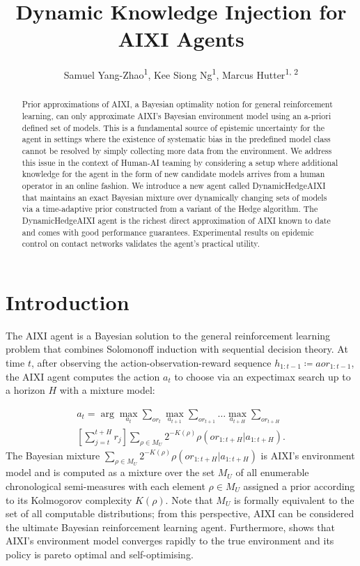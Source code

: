 \documentclass[letterpaper]{article} %
\title{Dynamic Knowledge Injection for AIXI Agents}
\author{
    Samuel Yang-Zhao\textsuperscript{\rm 1},
    Kee Siong Ng\textsuperscript{\rm 1},
    Marcus Hutter\textsuperscript{\rm 1, 2}
}
\theoremstyle{definition}
\begin{document}
\maketitle


\begin{abstract}
Prior approximations of AIXI, a Bayesian optimality notion for general reinforcement learning, can only approximate AIXI's Bayesian environment model using an a-priori defined set of models. This is a fundamental source of epistemic uncertainty for the agent in settings where the existence of systematic bias in the predefined model class cannot be resolved by simply collecting more data from the environment. We address this issue in the context of Human-AI teaming by considering a setup where additional knowledge for the agent in the form of new candidate models arrives from a human operator in an online fashion. We introduce a new agent called DynamicHedgeAIXI that maintains an exact Bayesian mixture over dynamically changing sets of models via a time-adaptive prior constructed from a variant of the Hedge algorithm. The DynamicHedgeAIXI agent is the richest direct approximation of AIXI known to date and comes with good performance guarantees. Experimental results on epidemic control on contact networks validates the agent's practical utility.
\end{abstract}



\section{Introduction}
The AIXI agent \cite{Hutter:04uaibook} is a Bayesian solution to the general reinforcement learning problem that combines Solomonoff induction \cite{solomonoff97} with sequential decision theory. At time $t$, after observing the action-observation-reward sequence $h_{1:t-1} \coloneqq aor_{1:t-1}$, the AIXI agent computes the action $a_t$ to choose via an expectimax search up to a horizon $H$ with a mixture model:

\begin{multline}
    a_t = \arg\max_{a_t} \sum_{or_t} \max_{a_{t+1}} \sum_{or_{t+1}} \ldots \max_{a_{t+H}} \sum_{or_{t+H}} \\
    \left[ \sum_{j = t}^{t+H} r_j \right] \sum_{\rho \in M_U} 2^{-K(\rho)} \rho(or_{1:t+H} | a_{1:t+H}). \label{eqn:aixi1}
\end{multline}
The Bayesian mixture ${\sum\limits_{\rho \in M_U} 2^{-K(\rho)} \rho(or_{1:t+H} | a_{1:t+H})}$ is AIXI's environment model and is computed as a mixture over the set $M_U$ of all enumerable chronological semi-measures with each element $\rho \in M_U$ assigned a prior according to its Kolmogorov complexity $K(\rho)$. Note that $M_U$ is formally equivalent to the set of all computable distributions; from this perspective, AIXI can be considered the ultimate Bayesian reinforcement learning agent. Furthermore, \cite{Hutter:04uaibook} shows that AIXI's environment model converges rapidly to the true environment and its policy is pareto optimal and self-optimising. 
\end{document}
